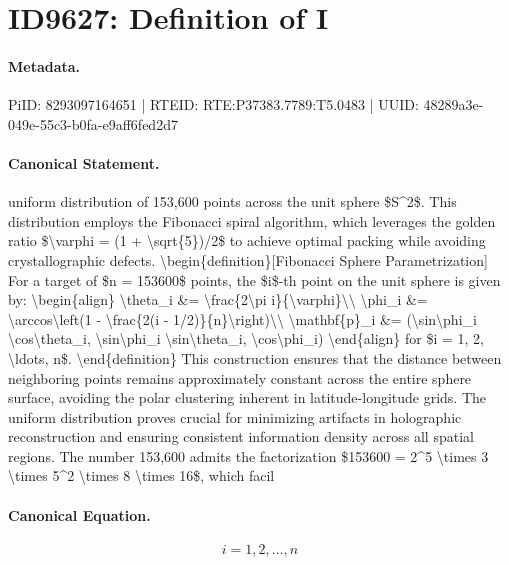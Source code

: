 \section*{ID9627: Definition of I}
\paragraph{Metadata.}
PiID: 8293097164651 | RTEID: RTE:P37383.7789:T5.0483 | UUID: 48289a3e-049e-55c3-b0fa-e9aff6fed2d7

\paragraph{Canonical Statement.}
uniform distribution of 153,600 points across the unit sphere \$S\textasciicircum{}2\$. This distribution employs the Fibonacci spiral algorithm, which leverages the golden ratio \$\textbackslash{}varphi = (1 + \textbackslash{}sqrt\{5\})/2\$ to achieve optimal packing while avoiding crystallographic defects. \textbackslash{}begin\{definition\}[Fibonacci Sphere Parametrization] For a target of \$n = 153600\$ points, the \$i\$-th point on the unit sphere is given by: \textbackslash{}begin\{align\} \textbackslash{}theta\_i \&= \textbackslash{}frac\{2\textbackslash{}pi i\}\{\textbackslash{}varphi\}\textbackslash{}\textbackslash{} \textbackslash{}phi\_i \&= \textbackslash{}arccos\textbackslash{}left(1 - \textbackslash{}frac\{2(i - 1/2)\}\{n\}\textbackslash{}right)\textbackslash{}\textbackslash{} \textbackslash{}mathbf\{p\}\_i \&= (\textbackslash{}sin\textbackslash{}phi\_i \textbackslash{}cos\textbackslash{}theta\_i, \textbackslash{}sin\textbackslash{}phi\_i \textbackslash{}sin\textbackslash{}theta\_i, \textbackslash{}cos\textbackslash{}phi\_i) \textbackslash{}end\{align\} for \$i = 1, 2, \textbackslash{}ldots, n\$. \textbackslash{}end\{definition\} This construction ensures that the distance between neighboring points remains approximately constant across the entire sphere surface, avoiding the polar clustering inherent in latitude-longitude grids. The uniform distribution proves crucial for minimizing artifacts in holographic reconstruction and ensuring consistent information density across all spatial regions. The number 153,600 admits the factorization \$153600 = 2\textasciicircum{}5 \textbackslash{}times 3 \textbackslash{}times 5\textasciicircum{}2 \textbackslash{}times 8 \textbackslash{}times 16\$, which facil

\paragraph{Canonical Equation.}
\[
i = 1, 2, \ldots, n
\]

